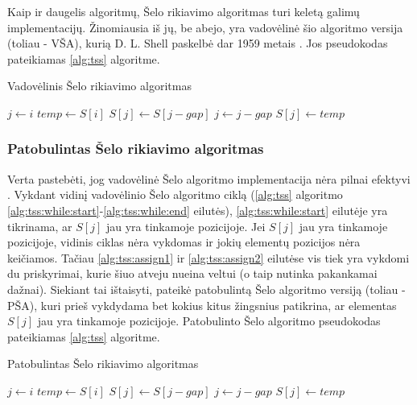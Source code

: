 \documentclass{VUMIFInfKursinis}
\begin{document}
Kaip ir daugelis algoritmų, Šelo rikiavimo algoritmas turi keletą galimų implementacijų.
Žinomiausia iš jų, be abejo, yra vadovėlinė šio algoritmo versija (toliau - VŠA),
kurią D. L. Shell paskelbė dar 1959 metais \cite{shell1959high}.
Jos pseudokodas pateikiamas \ref{alg:tss} algoritme.

\begin{algorithm}[H]
  \caption{Vadovėlinis Šelo rikiavimo algoritmas}\label{alg:tss}
  \begin{algorithmic}[1]
      \State $j\gets i$
      \State $temp\gets S[i]$\label{alg:tss:assign1}
      \label{alg:tss:while:start}
        \State $S[j]\gets S[j - gap]$
        \State $j\gets j-gap$
      \EndWhile\label{alg:tss:while:end}
      \State $S[j]\gets temp$\label{alg:tss:assign2}
    \EndFor
  \EndFor
  \end{algorithmic}
\end{algorithm}

\subsubsection{Patobulintas Šelo rikiavimo algoritmas}

Verta pastebėti, jog vadovėlinė Šelo algoritmo implementacija nėra pilnai efektyvi \cite{Radavičius_Baranauskas_2013}.
Vykdant vidinį vadovėlinio Šelo algoritmo ciklą (\ref{alg:tss} algoritmo \ref{alg:tss:while:start}-\ref{alg:tss:while:end} eilutės),
\ref{alg:tss:while:start} eilutėje yra tikrinama, ar $S[j]$ jau yra tinkamoje pozicijoje.
Jei $S[j]$ jau yra tinkamoje pozicijoje, vidinis ciklas nėra vykdomas ir jokių elementų pozicijos nėra keičiamos.
Tačiau \ref{alg:tss:assign1} ir \ref{alg:tss:assign2} eilutėse vis tiek yra vykdomi du priskyrimai,
kurie šiuo atveju nueina veltui (o taip nutinka pakankamai dažnai).
Siekiant tai ištaisyti, \cite{Radavičius_Baranauskas_2013} pateikė patobulintą Šelo algoritmo versiją (toliau - PŠA), kuri prieš vykdydama
bet kokius kitus žingsnius patikrina, ar elementas $S[j]$ jau yra tinkamoje pozicijoje.
Patobulinto Šelo algoritmo pseudokodas pateikiamas \ref{alg:tss} algoritme.

\begin{algorithm}[H]
  \caption{Patobulintas Šelo rikiavimo algoritmas}\label{alg:iss}
  \begin{algorithmic}[1]
        \State $j\gets i$
        \State $temp\gets S[i]$
        \Repeat
          \State $S[j]\gets S[j - gap]$
          \State $j\gets j-gap$
        \State $S[j]\gets temp$
      \EndIf
    \EndFor
  \EndFor
  \end{algorithmic}
\end{algorithm}
\end{document}
